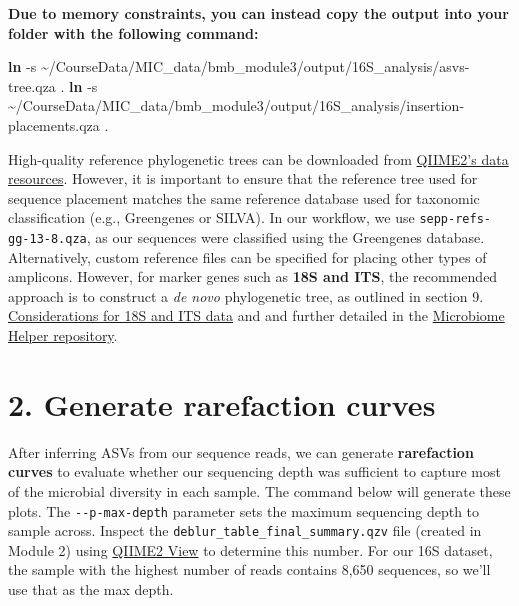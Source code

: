 \documentclass[
]{book}
\newenvironment{Shaded}{\begin{snugshade}}{\end{snugshade}}
\newcommand{\AttributeTok}[1]{\textcolor[rgb]{0.13,0.29,0.53}{#1}}
\newcommand{\FunctionTok}[1]{\textcolor[rgb]{0.13,0.29,0.53}{\textbf{#1}}}
\newcommand{\NormalTok}[1]{#1}
\begin{document}
\textbf{Due to memory constraints, you can instead copy the output into your folder with the following command:}

\begin{Shaded}
\begin{Highlighting}[]
\FunctionTok{ln} \AttributeTok{{-}s}\NormalTok{ \textasciitilde{}/CourseData/MIC\_data/bmb\_module3/output/16S\_analysis/asvs{-}tree.qza .}
\FunctionTok{ln} \AttributeTok{{-}s}\NormalTok{ \textasciitilde{}/CourseData/MIC\_data/bmb\_module3/output/16S\_analysis/insertion{-}placements.qza .}
\end{Highlighting}
\end{Shaded}

High-quality reference phylogenetic trees can be downloaded from \href{https://docs.qiime2.org/2024.10/data-resources/}{QIIME2's data resources}. However, it is important to ensure that the reference tree used for sequence placement matches the same reference database used for taxonomic classification (e.g., Greengenes or SILVA). In our workflow, we use \texttt{sepp-refs-gg-13-8.qza}, as our sequences were classified using the Greengenes database. Alternatively, custom reference files can be specified for placing other types of amplicons. However, for marker genes such as \textbf{18S and ITS}, the recommended approach is to construct a \emph{de novo} phylogenetic tree, as outlined in section 9. \hyperref[9-considerations-for-18s-and-its-data]{Considerations for 18S and ITS data} and and further detailed in the \href{https://github.com/LangilleLab/microbiome_helper/wiki/Amplicon-SOP-v2-(qiime2-2022.11)}{Microbiome Helper repository}.

\section{2. Generate rarefaction curves}\label{rarefaction-curves}

After inferring ASVs from our sequence reads, we can generate \textbf{rarefaction curves} to evaluate whether our sequencing depth was sufficient to capture most of the microbial diversity in each sample. The command below will generate these plots. The \texttt{-\/-p-max-depth} parameter sets the maximum sequencing depth to sample across. Inspect the \texttt{deblur\_table\_final\_summary.qzv} file (created in Module 2) using \href{https://view.qiime2.org/}{QIIME2 View} to determine this number. For our 16S dataset, the sample with the highest number of reads contains 8,650 sequences, so we'll use that as the max depth.
\end{document}
